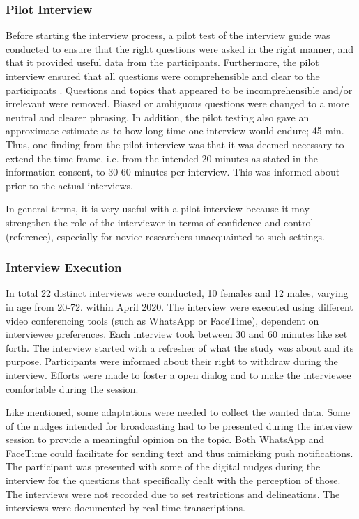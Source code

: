         \subsubsection{Pilot Interview}
        Before starting the interview process, a pilot test of the interview guide was conducted to ensure that the right questions were asked in the right manner, and that it provided useful data from the participants. Furthermore, the pilot interview ensured that all questions were comprehensible and clear to the  participants \cite{lazar_research_2017}. Questions and topics that appeared to be incomprehensible and/or irrelevant were removed. Biased or ambiguous questions were changed to a more neutral and clearer phrasing. In addition, the pilot testing also gave an approximate estimate as to how long time one interview would endure; 45 min. Thus, one finding from the pilot interview was that it was deemed necessary to extend the time frame, i.e. from the intended 20 minutes as stated in the information consent, to 30-60 minutes per interview. This was informed about prior to the actual interviews.
        
        In general terms, it is very useful with a pilot interview because it may strengthen the role of the interviewer in terms of confidence and control \cite{lazar_research_2017} (reference), especially for novice researchers unacquainted to such settings. 
        
        \subsubsection{Interview Execution}
        In total 22 distinct interviews were conducted, 10 females and 12 males, varying in age from 20-72. within April 2020.  The interview were executed using different video conferencing tools (such as WhatsApp or FaceTime), dependent on interviewee preferences. Each interview took between 30 and 60 minutes like set forth. The interview started with a refresher of what the study was about and its purpose. Participants were informed about their right to withdraw during the interview. Efforts were made to foster a open dialog and to make the interviewee comfortable during the session. 
 
        Like mentioned, some adaptations were needed to collect the wanted data. Some of the nudges intended for broadcasting had to be presented during the interview session to provide a meaningful opinion on the topic. Both WhatsApp and FaceTime could facilitate for sending text and thus mimicking push notifications. The participant was presented with some of the digital nudges during the interview for the questions that specifically dealt with the perception of those.
        The interviews were not recorded due to set restrictions and delineations. The interviews were documented by real-time transcriptions. 

